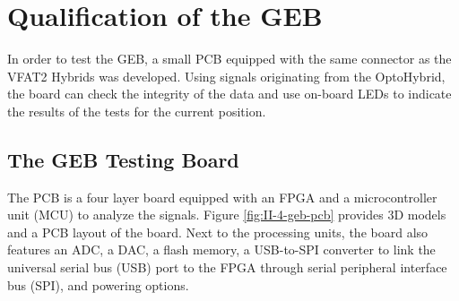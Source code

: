   \section{Qualification of the GEB}

    In order to test the GEB, a small PCB equipped with the same connector as the VFAT2 Hybrids was developed. Using signals originating from the OptoHybrid, the board can check the integrity of the data and use on-board LEDs to indicate the results of the tests for the current position.

    \subsection{The GEB Testing Board}

      The PCB is a four layer board equipped with an FPGA and a microcontroller unit (MCU) to analyze the signals. Figure \ref{fig:II-4-geb-pcb} provides 3D models and a PCB layout of the board. Next to the processing units, the board also features an ADC, a DAC, a flash memory, a USB-to-SPI converter to link the universal serial bus (USB) port to the FPGA through serial peripheral interface bus (SPI), and powering options.

